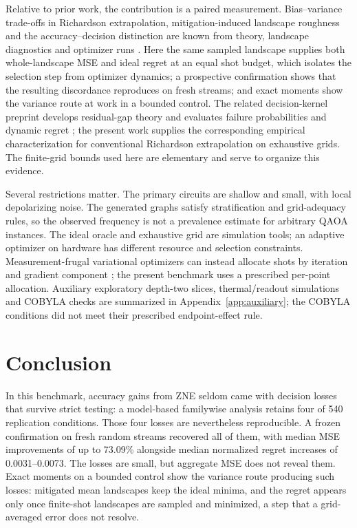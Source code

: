 Relative to prior work, the contribution is a paired measurement. Bias--variance trade-offs in Richardson extrapolation, mitigation-induced landscape roughness and the accuracy--decision distinction are known from theory, landscape diagnostics and optimizer runs \citep{Krebsbach2022RichardsonOptimization,Wang2024Trainability,Liu2023OSCAR,SackEgger2024MLMitigation}. Here the same sampled landscape supplies both whole-landscape MSE and ideal regret at an equal shot budget, which isolates the selection step from optimizer dynamics; a prospective confirmation shows that the resulting discordance reproduces on fresh streams; and exact moments show the variance route at work in a bounded control. The related decision-kernel preprint develops residual-gap theory and evaluates failure probabilities and dynamic regret \citep{Scavino2026DecisionKernels}; the present work supplies the corresponding empirical characterization for conventional Richardson extrapolation on exhaustive grids. The finite-grid bounds used here are elementary and serve to organize this evidence.

Several restrictions matter. The primary circuits are shallow and small, with local depolarizing noise. The generated graphs satisfy stratification and grid-adequacy rules, so the observed frequency is not a prevalence estimate for arbitrary QAOA instances. The ideal oracle and exhaustive grid are simulation tools; an adaptive optimizer on hardware has different resource and selection constraints. Measurement-frugal variational optimizers can instead allocate shots by iteration and gradient component \citep{Kubler2020MeasurementFrugal}; the present benchmark uses a prescribed per-point allocation. Auxiliary exploratory depth-two slices, thermal/readout simulations and COBYLA checks are summarized in Appendix~\ref{app:auxiliary}; the COBYLA conditions did not meet their prescribed endpoint-effect rule.

\section{Conclusion}
In this benchmark, accuracy gains from ZNE seldom came with decision losses that survive strict testing: a model-based familywise analysis retains four of 540 replication conditions. Those four losses are nevertheless reproducible. A frozen confirmation on fresh random streams recovered all of them, with median MSE improvements of up to 73.09\% alongside median normalized regret increases of 0.0031--0.0073. The losses are small, but aggregate MSE does not reveal them. Exact moments on a bounded control show the variance route producing such losses: mitigated mean landscapes keep the ideal minima, and the regret appears only once finite-shot landscapes are sampled and minimized, a step that a grid-averaged error does not resolve.

